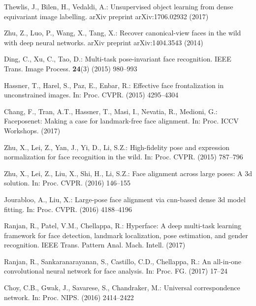 \documentclass[runningheads]{llncs}
\begin{document}
\begin{thebibliography}{10}
Thewlis, J., Bilen, H., Vedaldi, A.:
\newblock Unsupervised object learning from dense equivariant image labelling.
\newblock arXiv preprint arXiv:1706.02932 (2017)

Zhu, Z., Luo, P., Wang, X., Tang, X.:
\newblock Recover canonical-view faces in the wild with deep neural networks.
\newblock arXiv preprint arXiv:1404.3543 (2014)

Ding, C., Xu, C., Tao, D.:
\newblock Multi-task pose-invariant face recognition.
\newblock IEEE Trans. Image Process. \textbf{24}(3) (2015)  980--993

Hassner, T., Harel, S., Paz, E., Enbar, R.:
\newblock Effective face frontalization in unconstrained images.
\newblock In: Proc. CVPR. (2015)  4295--4304

Chang, F., Tran, A.T., Hassner, T., Masi, I., Nevatia, R., Medioni, G.:
\newblock Faceposenet: Making a case for landmark-free face alignment.
\newblock In: Proc. ICCV Workshops. (2017)

Zhu, X., Lei, Z., Yan, J., Yi, D., Li, S.Z.:
\newblock High-fidelity pose and expression normalization for face recognition
  in the wild.
\newblock In: Proc. CVPR. (2015)  787--796

Zhu, X., Lei, Z., Liu, X., Shi, H., Li, S.Z.:
\newblock Face alignment across large poses: A 3d solution.
\newblock In: Proc. CVPR. (2016)  146--155

Jourabloo, A., Liu, X.:
\newblock Large-pose face alignment via cnn-based dense 3d model fitting.
\newblock In: Proc. CVPR. (2016)  4188--4196

Ranjan, R., Patel, V.M., Chellappa, R.:
\newblock Hyperface: A deep multi-task learning framework for face detection,
  landmark localization, pose estimation, and gender recognition.
\newblock IEEE Trans. Pattern Anal. Mach. Intell. (2017)

Ranjan, R., Sankaranarayanan, S., Castillo, C.D., Chellappa, R.:
\newblock An all-in-one convolutional neural network for face analysis.
\newblock In: Proc. FG. (2017)  17--24

Choy, C.B., Gwak, J., Savarese, S., Chandraker, M.:
\newblock Universal correspondence network.
\newblock In: Proc. NIPS. (2016)  2414--2422


\end{thebibliography}
\end{document}
